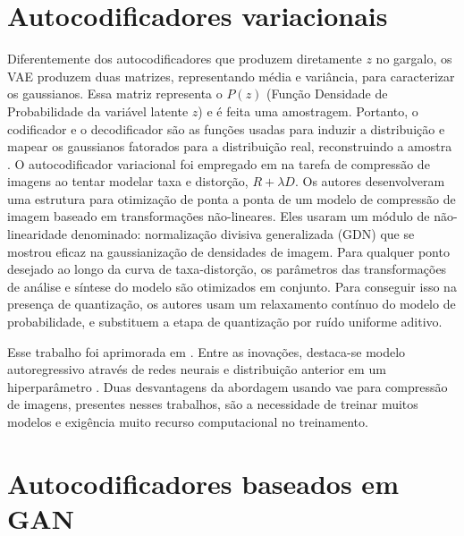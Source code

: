 
\section{Autocodificadores variacionais}



Diferentemente dos autocodificadores que produzem diretamente $z$ no gargalo, os VAE produzem duas matrizes, representando média e variância, para caracterizar os gaussianos. Essa matriz representa o $P(z)$ (Função Densidade de Probabilidade  da variável latente $z$) e é feita uma amostragem. Portanto, o codificador e o decodificador são as funções usadas para induzir a distribuição e mapear os gaussianos fatorados para a distribuição real, reconstruindo a amostra \cite{DeliverableSeptember}. 
O autocodificador variacional foi empregado em \cite{End2016Balle} na tarefa de compressão de imagens ao tentar modelar taxa e distorção, $R +\lambda D$. Os autores desenvolveram uma estrutura para otimização de ponta a ponta de um modelo de compressão de imagem baseado em transformações não-lineares.
Eles usaram um módulo de não-linearidade denominado: normalização divisiva generalizada (GDN) que se mostrou eficaz na gaussianização de densidades de imagem. 
Para qualquer ponto desejado ao longo da curva de taxa-distorção, os parâmetros das transformações de análise e síntese do modelo são otimizados em conjunto.
Para conseguir isso na presença de quantização, os autores usam  um relaxamento contínuo do modelo de probabilidade, e substituem a etapa de quantização por ruído uniforme aditivo. 

Esse trabalho foi aprimorada em  \cite{Variational2018Balle,Autoregressive2018Minnen}. Entre as inovações, destaca-se modelo autoregressivo através de redes neurais \cite{Autoregressive2018Minnen} e  distribuição anterior em um hiperparâmetro \cite{Autoregressive2018Minnen,Variational2018Balle}. Duas desvantagens da abordagem usando  \acrshort{vae} para compressão de imagens, presentes nesses trabalhos, são a necessidade de treinar muitos modelos e exigência muito recurso computacional no treinamento. 



\section{Autocodificadores baseados em GAN}



